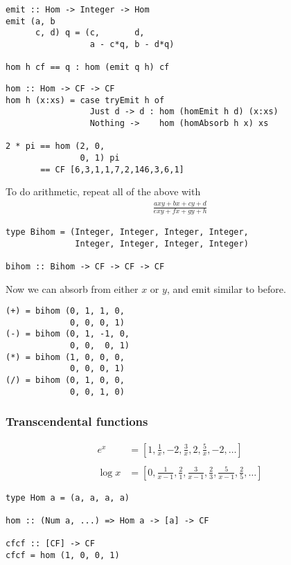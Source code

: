 \documentclass[11pt,aspectratio=169]{beamer}
\begin{document}
\begin{frame}[fragile]
\begin{verbatim}
emit :: Hom -> Integer -> Hom
emit (a, b
      c, d) q = (c,       d,
                 a - c*q, b - d*q)

hom h cf == q : hom (emit q h) cf
\end{verbatim}
\end{frame}

\begin{frame}[fragile]
\begin{verbatim}
hom :: Hom -> CF -> CF
hom h (x:xs) = case tryEmit h of
                 Just d -> d : hom (homEmit h d) (x:xs)
                 Nothing ->    hom (homAbsorb h x) xs

2 * pi == hom (2, 0,
               0, 1) pi
       == CF [6,3,1,1,7,2,146,3,6,1]
\end{verbatim}
\end{frame}

\begin{frame}[fragile]
To do arithmetic, repeat all of the above with
\begin{align*}
\frac{axy + bx + cy + d}{exy + fx + gy + h}
\end{align*}
\begin{verbatim}
type Bihom = (Integer, Integer, Integer, Integer,
              Integer, Integer, Integer, Integer)

bihom :: Bihom -> CF -> CF -> CF
\end{verbatim}
Now we can absorb from either $x$ or $y$, and emit similar to before.
\end{frame}

\begin{frame}[fragile]
\begin{verbatim}
(+) = bihom (0, 1, 1, 0,
             0, 0, 0, 1)
(-) = bihom (0, 1, -1, 0,
             0, 0,  0, 1)
(*) = bihom (1, 0, 0, 0,
             0, 0, 0, 1)
(/) = bihom (0, 1, 0, 0,
             0, 0, 1, 0)
\end{verbatim}
\end{frame}

\begin{frame}[fragile]
\frametitle{Transcendental functions}
\pause
\begin{align*}
e^x &= [1, \frac{1}{x}, -2, \frac{3}{x}, 2, \frac{5}{x}, -2, \dots] \\
~\\
\log x &= [0, \frac{1}{x-1}, \frac{2}{1}, \frac{3}{x-1}, \frac{2}{3}, \frac{5}{x-1}, \frac{2}{5}, \dots]
\end{align*}
\pause
\begin{verbatim}
type Hom a = (a, a, a, a)

hom :: (Num a, ...) => Hom a -> [a] -> CF

cfcf :: [CF] -> CF
cfcf = hom (1, 0, 0, 1)
\end{verbatim}
\end{frame}
\end{document}
